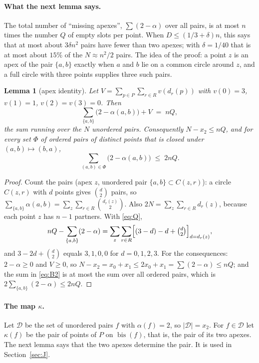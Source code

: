 \documentclass[11pt]{article}
\newcommand{\cD}{\mathcal{D}}
\newcommand{\bis}{\operatorname{bis}}
\newtheorem{lemma}[theorem]{Lemma}
\theoremstyle{remark}
\begin{document}
\paragraph{What the next lemma says.} The total number of ``missing
apexes'', $\sum (2 - \alpha)$ over all pairs, is at most $n$ times the
number $Q$ of empty slots per point. When $D \le (1/3+\delta)n$, this says
that at most about $3\delta n^2$ pairs have fewer than two apexes; with $\delta = 1/40$
that is at most about $15\%$ of the $N \approx n^2/2$ pairs. The idea of
the proof: a point $z$ is an apex of the pair $\{a,b\}$ exactly when $a$
and $b$ lie on a common circle around $z$, and a full circle with three
points supplies three such pairs.

\begin{lemma}[apex identity]\label{lem:apex}
Let $V = \sum_{p \in P}\sum_{r \in R} v(d_r(p))$ with $v(0) = 3$,
$v(1) = 1$, $v(2) = v(3) = 0$. Then
\[
  \sum_{\{a,b\}} \bigl(2 - \alpha(a,b)\bigr) + V \;=\; nQ ,
\]
the sum running over the $N$ unordered pairs. Consequently
$N - x_2 \le nQ$, and for every set $\Phi$ of ordered pairs of distinct
points that is closed under $(a,b) \mapsto (b,a)$,
\begin{equation}\label{eq:B2}
  \sum_{(a,b) \in \Phi} \bigl(2 - \alpha(a,b)\bigr) \;\le\; 2nQ .
\end{equation}
\end{lemma}

\begin{proof}
Count the pairs (apex $z$, unordered pair $\{a,b\} \subset C(z,r)$): a
circle $C(z,r)$ with $d$ points gives $\binom d2$ pairs, so
$\sum_{\{a,b\}} \alpha(a,b) = \sum_{z}\sum_{r\in R}\binom{d_r(z)}{2}$.
Also $2N = \sum_z \sum_{r \in R} d_r(z)$, because each point $z$ has $n-1$
partners. With \eqref{eq:Q},
\[
  nQ - \sum_{\{a,b\}}(2-\alpha) = \sum_z \sum_{r \in R}
  \Bigl[(3 - d) - d + \tbinom d2\Bigr]_{d = d_r(z)},
\]
and $3 - 2d + \binom d2$ equals $3, 1, 0, 0$ for $d = 0, 1, 2, 3$. For the
consequences: $2 - \alpha \ge 0$ and $V \ge 0$, so
$N - x_2 = x_0 + x_1 \le 2x_0 + x_1 = \sum (2 - \alpha) \le nQ$; and the
sum in \eqref{eq:B2} is at most the sum over all ordered pairs, which is
$2\sum_{\{a,b\}}(2-\alpha) \le 2nQ$.
\end{proof}

\paragraph{The map $\kappa$.} Let $\cD$ be the set of unordered pairs $f$
with $\alpha(f) = 2$, so $|\cD| = x_2$. For $f \in \cD$ let $\kappa(f)$ be
the pair of points of $P$ on $\bis(f)$, that is, the pair of its two
apexes. The next lemma says that the two apexes determine the pair. It is
used in Section~\ref{sec:J}.
\end{document}
